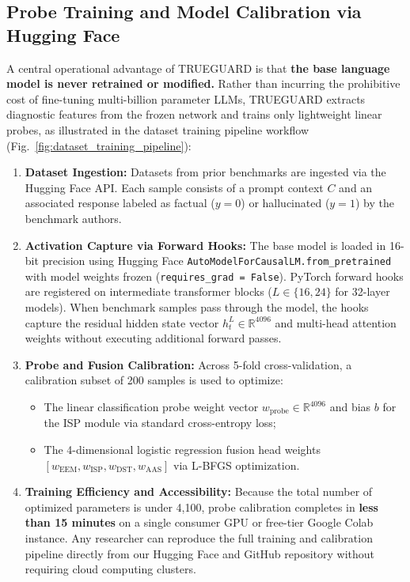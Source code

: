 \documentclass[journal]{IEEEtran}
\begin{document}
\subsection{Probe Training and Model Calibration via Hugging Face}
A central operational advantage of TRUEGUARD is that \textbf{the base language model is never retrained or modified.} Rather than incurring the prohibitive cost of fine-tuning multi-billion parameter LLMs, TRUEGUARD extracts diagnostic features from the frozen network and trains only lightweight linear probes, as illustrated in the dataset training pipeline workflow (Fig.~\ref{fig:dataset_training_pipeline}):
\begin{enumerate}
    \item \textbf{Dataset Ingestion:} Datasets from prior benchmarks are ingested via the Hugging Face API. Each sample consists of a prompt context $C$ and an associated response labeled as factual ($y = 0$) or hallucinated ($y = 1$) by the benchmark authors.
    \item \textbf{Activation Capture via Forward Hooks:} The base model is loaded in 16-bit precision using Hugging Face \texttt{AutoModelForCausalLM.from\_pretrained} with model weights frozen (\texttt{requires\_grad = False}). PyTorch forward hooks are registered on intermediate transformer blocks ($L \in \{16, 24\}$ for 32-layer models). When benchmark samples pass through the model, the hooks capture the residual hidden state vector $h_t^L \in \mathbb{R}^{4096}$ and multi-head attention weights without executing additional forward passes.
    \item \textbf{Probe and Fusion Calibration:} Across 5-fold cross-validation, a calibration subset of 200 samples is used to optimize:
    \begin{itemize}
        \item The linear classification probe weight vector $w_{\text{probe}} \in \mathbb{R}^{4096}$ and bias $b$ for the ISP module via standard cross-entropy loss;
        \item The 4-dimensional logistic regression fusion head weights $[w_{\text{EEM}}, w_{\text{ISP}}, w_{\text{DST}}, w_{\text{AAS}}]$ via L-BFGS optimization.
    \end{itemize}
    \item \textbf{Training Efficiency and Accessibility:} Because the total number of optimized parameters is under 4,100, probe calibration completes in \textbf{less than 15 minutes} on a single consumer GPU or free-tier Google Colab instance. Any researcher can reproduce the full training and calibration pipeline directly from our Hugging Face and GitHub repository without requiring cloud computing clusters.
\end{enumerate}
\end{document}
